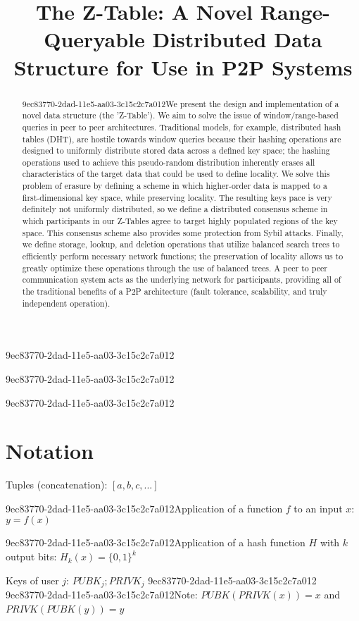 \documentclass[12pt]{article}
\title{The Z-Table: A Novel Range-Queryable Distributed Data Structure for Use in P2P Systems}
\begin{document}
9ec83770-2dad-11e5-aa03-3c15c2c7a012\maketitle

9ec83770-2dad-11e5-aa03-3c15c2c7a012\begin{abstract}
9ec83770-2dad-11e5-aa03-3c15c2c7a012We present the design and implementation of a novel data structure (the 'Z-Table'). We aim to solve the issue of window/range-based queries in peer to peer architectures. Traditional models, for example,  distributed hash tables (DHT), are hostile towards window queries because their hashing operations are designed to uniformly distribute stored data across a defined key space; the hashing operations used to achieve this pseudo-random distribution inherently erases all characteristics of the target data that could be used to define locality. We solve this problem of erasure by defining a scheme in which higher-order data is mapped to a first-dimensional key space, while preserving locality. The resulting keys pace is very definitely not uniformly distributed, so we define a distributed consensus scheme in which participants in our Z-Tables agree to target highly populated regions of the key space. This consensus scheme also provides some protection from Sybil attacks. Finally, we define storage, lookup, and deletion operations that utilize balanced search trees to efficiently perform necessary network functions; the preservation of locality allows us to greatly optimize these operations through the use of balanced trees. A peer to peer communication system acts as the underlying network for participants, providing all of the traditional benefits of a P2P architecture (fault tolerance, scalability, and truly independent operation).
\end{abstract}

9ec83770-2dad-11e5-aa03-3c15c2c7a012\section{Notation}

Tuples (concatenation): $[a,b,c,...]$

9ec83770-2dad-11e5-aa03-3c15c2c7a012Application of a function $f$ to an input $x$: $y=f(x)$

9ec83770-2dad-11e5-aa03-3c15c2c7a012Application of a hash function $H$ with $k$ output bits: $H_{k}(x) = \{0,1\}^k$

Keys of user $j$: $ PUBK_j; PRIVK_j $
9ec83770-2dad-11e5-aa03-3c15c2c7a012
9ec83770-2dad-11e5-aa03-3c15c2c7a012Note: $PUBK(PRIVK(x)) = x$ and $PRIVK(PUBK(y)) = y$~
\end{document}
